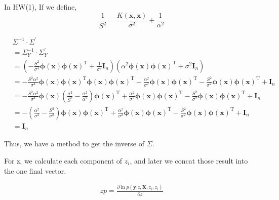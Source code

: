 \documentclass[11pt]{article}
\newcommand{\mbf}[1]{{\boldsymbol{\mathbf{#1}}}}
\renewcommand{\bm}{\mbf}
\begin{document}
\begin{enumerate}
In HW(1), If we define,
\begin{equation}
    \frac{1}{S^{2}}=\frac{K(\bm{x},\bm{x})}{\sigma^{2}}+\frac{1}{\alpha^{2}}
\end{equation}


\begin{equation}
    \begin{aligned}
    &\Sigma^{-1} \cdot \Sigma^{\prime} \\
    &=\Sigma_{Y}^{-1} \cdot \Sigma_{Y}^{\prime} \\
    &=\left(-\frac{S^{2}}{\sigma^{4}} \mathbf{\phi(x)} \mathbf{\phi(x)}^{\mathrm{T}}+\frac{1}{\sigma^{2}} \mathbf{I}_{n}\right)\left(\alpha^{2} \mathbf{\phi(x)} \mathbf{\phi(x)}^{\mathrm{T}}+\sigma^{2} \mathbf{I}_{n}\right) \\
    &=-\frac{S^{2} \alpha^{2}}{\sigma^{4}} \mathbf{\phi(x)} \mathbf{\phi(x)}^{\mathrm{T}} \mathbf{\phi(x)} \mathbf{\phi(x)}^{\mathrm{T}}+\frac{\alpha^{2}}{\sigma^{2}} \mathbf{\phi(x)} \mathbf{\phi(x)}^{\mathrm{T}}-\frac{S^{2}}{\sigma^{2}} \mathbf{\phi(x)} \mathbf{\phi(x)}^{\mathrm{T}}+\mathbf{I}_{n} \\
    &=-\frac{S^{2} \alpha^{2}}{\sigma^{4}} \mathbf{\phi(x)}\left(\frac{\sigma^{2}}{S^{2}}-\frac{\sigma^{2}}{\alpha^{2}}\right) \mathbf{\phi(x)}^{\mathrm{T}}+\frac{\alpha^{2}}{\sigma^{2}} \mathbf{\phi(x)} \mathbf{\phi(x)}^{\mathrm{T}}-\frac{S^{2}}{\sigma^{2}} \mathbf{\phi(x)} \mathbf{\phi(x)}^{\mathrm{T}}+\mathbf{I}_{n} \\
    &=-\left(\frac{\alpha^{2}}{\sigma^{2}}-\frac{S^{2}}{\sigma^{2}}\right) \mathbf{\phi(x)} \mathbf{\phi(x)}^{\mathrm{T}}+\frac{\alpha^{2}}{\sigma^{2}} \mathbf{\phi(x)} \mathbf{\phi(x)}^{\mathrm{T}}-\frac{S^{2}}{\sigma^{2}} \mathbf{\phi(x)} \mathbf{\phi(x)}^{\mathrm{T}}+\mathbf{I}_{n} \\
    &=\mathbf{I}_{n}
    \end{aligned}
\end{equation}

Thus, we have a method to get the inverse of $\Sigma$.

For z, we calculate each component of $z_i$, and later we concat those result into the one final vector.

\begin{align}
    zp = \frac{\partial{\ln p(\bm{y} |z ,\bm{X}, z_i, z_i)}}{\partial{z}}  
\end{align}


\end{enumerate}
\end{document}
